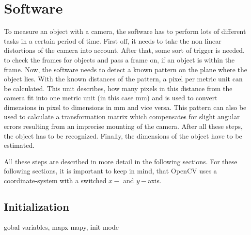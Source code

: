 \section{Software}
To measure an object with a camera, the software has to perform lots of different tasks in a certain period of time.
First off, it needs to take the non linear distortions of the camera into account.
After that, some sort of trigger is needed, to check the frames for objects and pass a frame on, if an object is within the frame.
Now, the software needs to detect a known pattern on the plane where the object lies.
With the known distances of the pattern, a pixel per metric unit can be calculated.
This unit describes, how many pixels in this distance from the camera fit into one metric unit (in this case mm) and is used to convert dimensions in pixel to dimensions in mm and vice versa.
This pattern can also be used to calculate a transformation matrix which compensates for slight angular errors resulting from an imprecise mounting of the camera.
After all these steps, the object has to be recognized.
Finally, the dimensions of the object have to be estimated.

All these steps are described in more detail in the following sections.
For these following sections, it is important to keep in mind, that OpenCV uses a coordinate-system with a switched $x-$ and $y-$axis. 


\lstset{style=mystyle}

\subsection{Initialization}
gobal variables, mapx mapy, init mode

